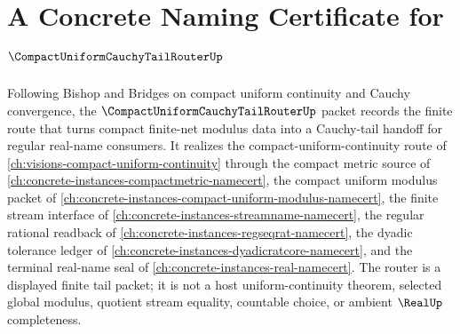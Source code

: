 \chapter{A Concrete Naming Certificate for $\CompactUniformCauchyTailRouterUp$}
\label{ch:concrete-instances-compact-uniform-cauchy-tail-router-namecert}

Following Bishop and Bridges on compact uniform continuity and Cauchy convergence, the $\CompactUniformCauchyTailRouterUp$ packet records the finite route that turns compact finite-net modulus data into a Cauchy-tail handoff for regular real-name consumers. It realizes the compact-uniform-continuity route of \autoref{ch:visions-compact-uniform-continuity} through the compact metric source of \autoref{ch:concrete-instances-compactmetric-namecert}, the compact uniform modulus packet of \autoref{ch:concrete-instances-compact-uniform-modulus-namecert}, the finite stream interface of \autoref{ch:concrete-instances-streamname-namecert}, the regular rational readback of \autoref{ch:concrete-instances-regseqrat-namecert}, the dyadic tolerance ledger of \autoref{ch:concrete-instances-dyadicratcore-namecert}, and the terminal real-name seal of \autoref{ch:concrete-instances-real-namecert}. The router is a displayed finite tail packet; it is not a host uniform-continuity theorem, selected global modulus, quotient stream equality, countable choice, or ambient $\RealUp$ completeness.

